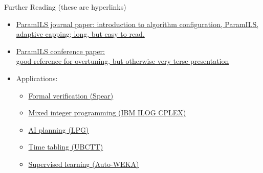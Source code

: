 \begin{frame}[c,fragile]{Further Reading (these are hyperlinks)}

\begin{itemize}
	\item \href{http://aad.informatik.uni-freiburg.de/papers/09-JAIR-ParamILS.pdf}{\alert{ParamILS journal paper}: introduction to algorithm configuration, ParamILS, adaptive capping; long, but easy to read.}
	\item \href{http://aad.informatik.uni-freiburg.de/papers/07-AAAI_ParamILS.pdf}{\alert{ParamILS conference paper}:\\good reference for overtuning, but otherwise very terse presentation} 

	\item Applications:
	\begin{itemize}
	  \item \href{http://aad.informatik.uni-freiburg.de/papers/07-fmcad-BoostingVerification.pdf}{Formal verification (Spear)}
	  \item \href{http://aad.informatik.uni-freiburg.de/papers/10-CPAIOR-MIP-Config.pdf}{Mixed integer programming (IBM ILOG CPLEX)}
	  \item \href{icaps11.icaps-conference.org/proceedings/pal/vallati-et-al.pdf}{AI planning (LPG)}
	  \item \href{https://www.cs.ubc.ca/cgi-bin/tr/2009/TR-2009-15.pdf}{Time tabling (UBCTT)}
	  \item \href{http://www.cs.ubc.ca/labs/beta/Projects/autoweka/papers/autoweka.pdf}{Supervised learning (Auto-WEKA)}
	\end{itemize}
\end{itemize}

\end{frame}
